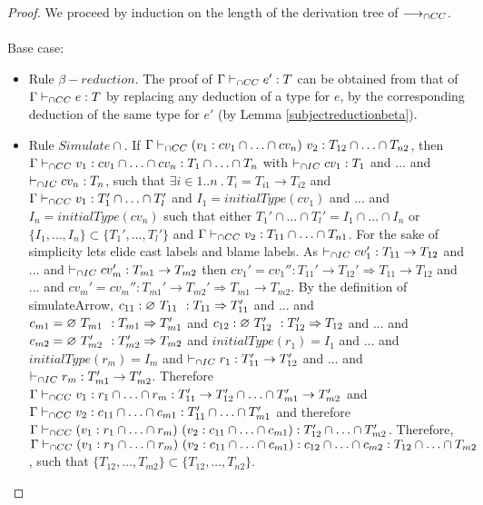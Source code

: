 \documentclass[a4paper]{article}
\begin{document}
\begin{proof}
We proceed by induction on the length of the derivation tree of $\longrightarrow_{\cap CC}$.\\\\
Base case:
\begin{itemize}
    \item Rule $\beta{-}reduction$.
    The proof of $\Gamma \vdash_{\cap CC} e' : T$ can be obtained from that of $\Gamma \vdash_{\cap CC} e : T$ by replacing any deduction of a type for $e$, by the corresponding deduction of the same type for $e'$ (by Lemma \ref{subjectreductionbeta}).
    \item Rule $Simulate{\cap}$.
    If $\Gamma \vdash_{\cap CC} (v_1 : cv_1 \cap \ldots \cap cv_n)\ v_2 : T_{12} \cap \ldots \cap T_{n2}$, then $\Gamma \vdash_{\cap CC} v_1 : cv_1 \cap \ldots \cap cv_n : T_1 \cap \ldots \cap T_n$ with $\vdash_{\cap IC} cv_1 : T_1$ and ... and $\vdash_{\cap IC} cv_n : T_n$, such that $\exists i \in 1 .. n\ .\ T_i = T_{i1} \rightarrow T_{i2}$ and $\Gamma \vdash_{\cap CC} v_1 : T_1' \cap \ldots \cap T_l'$ and $I_1 = initialType(cv_1)$ and ... and $I_n = initialType(cv_n)$ such that either $T_1' \cap \ldots \cap T_l' = I_1 \cap \ldots \cap I_n$ or $\{I_1, \ldots, I_n\} \subset \{T_1', \ldots, T_l'\}$ and $\Gamma \vdash_{\cap CC} v_2 : T_{11} \cap \ldots \cap T_{n1}$.
    For the sake of simplicity lets elide cast labels and blame labels.
    As $\vdash_{\cap IC} cv_1' : T_{11} \rightarrow T_{12}$ and ... and $\vdash_{\cap IC} cv_m' : T_{m1} \rightarrow T_{m2}$ then $cv_1' = cv_1'' : T_{11}' \rightarrow T_{12}' \Rightarrow T_{11} \rightarrow T_{12}$ and ... and $cv_m' = cv_m'' : T_{m1}' \rightarrow T_{m2}' \Rightarrow T_{m1} \rightarrow T_{m2}$.
    By the definition of simulateArrow, $c_{11} : \varnothing\ T_{11}\ ^{} : T_{11} \Rightarrow T_{11}'$ and ... and $c_{m1} = \varnothing\ T_{m1}\ ^{} : T_{m1} \Rightarrow T_{m1}'$ and $c_{12} : \varnothing\ T_{12}'\ ^{} : T_{12}' \Rightarrow T_{12}$ and ... and $c_{m2} = \varnothing\ T_{m2}'\ ^{} : T_{m2}' \Rightarrow T_{m2}$ and $initialType(r_1) = I_1$ and ... and $initialType(r_m) = I_m$ and $\vdash_{\cap IC} r_1 : T_{11}' \rightarrow T_{12}'$ and ... and $\vdash_{\cap IC} r_m : T_{m1}' \rightarrow T_{m2}'$.
    Therefore $\Gamma \vdash_{\cap CC} v_1 : r_1 \cap \ldots \cap r_m : T_{11}' \rightarrow T_{12}' \cap \ldots \cap T_{m1}' \rightarrow T_{m2}'$ and $\Gamma \vdash_{\cap CC} v_2 : c_{11} \cap \ldots \cap c_{m1} : T_{11}' \cap \ldots \cap T_{m1}'$ and therefore $\Gamma \vdash_{\cap CC} (v_1 : r_1 \cap \ldots \cap r_m)\ (v_2 : c_{11} \cap \ldots \cap c_{m1}) : T_{12}' \cap \ldots \cap T_{m2}'$.
    Therefore, $\Gamma \iccts (v_1 : r_1 \cap \ldots \cap r_m)\ (v_2 : c_{11} \cap \ldots \cap c_{m1}) : c_{12} \cap \ldots \cap c_{m2} : T_{12} \cap \ldots \cap T_{m2}$, such that $\{T_{12}, \ldots, T_{m2}\} \subset \{T_{12}, \ldots, T_{n2}\}$.

\end{itemize}
\end{proof}
\end{document}
